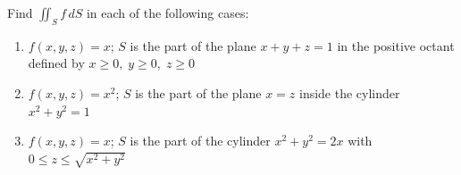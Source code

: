 \documentclass[openany]{book}
\begin{document}
\begin{prob}[12]
Find \(\displaystyle \iint_S f \, dS\) in each of the following cases:

\begin{enumerate}
    \item[(a)] \( f(x, y, z) = x \); \( S \) is the part of the plane  
          \( x + y + z = 1 \) in the positive octant defined by  
          \( x \geq 0, \; y \geq 0, \; z \geq 0 \)
    \item[(b)] \( f(x, y, z) = x^2 \); \( S \) is the part of the plane \( x = z \) inside the cylinder \( x^2 + y^2 = 1 \)
    \item[(c)] \( f(x, y, z) = x \); \( S \) is the part of the cylinder \( x^2 + y^2 = 2x \) with \( 0 \leq z \leq \sqrt{x^2 + y^2} \)
\end{enumerate}
\end{prob}
\end{document}
